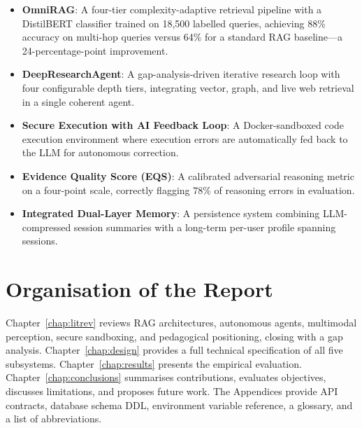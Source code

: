 \begin{itemize}
    \item \textbf{OmniRAG}: A four-tier complexity-adaptive retrieval pipeline with a DistilBERT classifier trained on 18,500 labelled queries, achieving 88\% accuracy on multi-hop queries versus 64\% for a standard RAG baseline---a 24-percentage-point improvement.
    \item \textbf{DeepResearchAgent}: A gap-analysis-driven iterative research loop with four configurable depth tiers, integrating vector, graph, and live web retrieval in a single coherent agent.
    \item \textbf{Secure Execution with AI Feedback Loop}: A Docker-sandboxed code execution environment where execution errors are automatically fed back to the LLM for autonomous correction.
    \item \textbf{Evidence Quality Score (EQS)}: A calibrated adversarial reasoning metric on a four-point scale, correctly flagging 78\% of reasoning errors in evaluation.
    \item \textbf{Integrated Dual-Layer Memory}: A persistence system combining LLM-compressed session summaries with a long-term per-user profile spanning sessions.
\end{itemize}

\section{Organisation of the Report}
\label{sec:organisation}

Chapter~\ref{chap:litrev} reviews RAG architectures, autonomous agents, multimodal perception, secure sandboxing, and pedagogical positioning, closing with a gap analysis. Chapter~\ref{chap:design} provides a full technical specification of all five subsystems. Chapter~\ref{chap:results} presents the empirical evaluation. Chapter~\ref{chap:conclusions} summarises contributions, evaluates objectives, discusses limitations, and proposes future work. The Appendices provide API contracts, database schema DDL, environment variable reference, a glossary, and a list of abbreviations.
